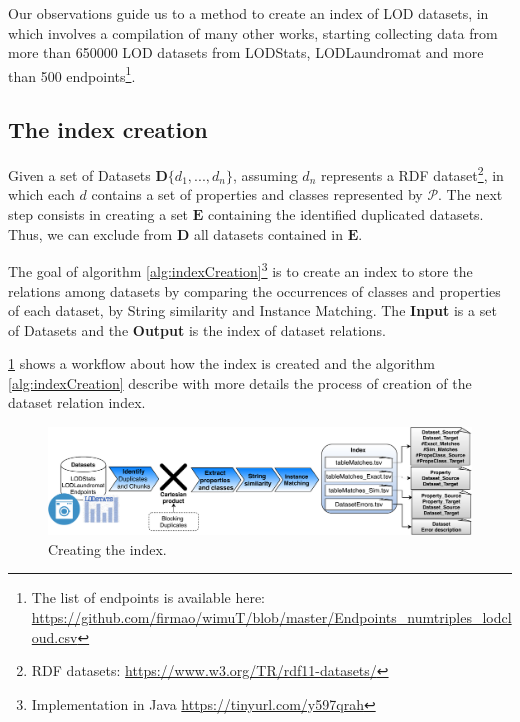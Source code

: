 \documentclass[sw]{iosart2x}
\begin{document}
Our observations guide us to a method to create an index of LOD datasets, in which involves a compilation of many other works, starting collecting data from more than \num{650000} LOD datasets from LODStats, LODLaundromat and more than 500 endpoints\footnote{The list of endpoints is available here: \url{https://github.com/firmao/wimuT/blob/master/Endpoints_numtriples_lodcloud.csv}}. 


\subsection{The index creation}
\label{sec:indexCreation}

Given a set of Datasets $\mathbf{D}\{d_1,...,d_n\}$, assuming $d_n$ represents a RDF dataset\footnote{RDF datasets: \url{https://www.w3.org/TR/rdf11-datasets/}}, in which each $d$ contains a set of properties and classes represented by $\mathcal{P}$. The next step consists in creating a set $\mathbf{E}$ containing the identified duplicated datasets. Thus, we can exclude from $\mathbf{D}$ all datasets contained in $\mathbf{E}$.

The goal of algorithm \ref{alg:indexCreation}\footnote{Implementation in Java \url{https://tinyurl.com/y597qrah}} is to create an index to store the relations among datasets by comparing the occurrences of classes and properties of each dataset, by String similarity and Instance Matching. The \textbf{Input} is a set of Datasets and the \textbf{Output} is the index of dataset relations.

\cref{fig:create} shows a workflow about how the index is created and the algorithm \ref{alg:indexCreation} describe with more details the process of creation of the dataset relation index.

\begin{figure}[htb] 
	\centering
	\includegraphics[width=\linewidth]{img/createIndex.pdf}
	\caption{Creating the index.}
	\label{fig:create}
\end{figure}
\end{document}
